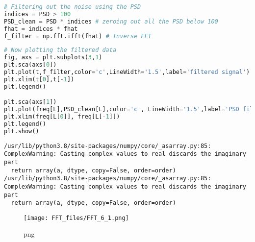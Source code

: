 \documentclass{article}
\begin{document}
\begin{lstlisting}[language=Python]
# Filtering out the noise using the PSD
indices = PSD > 100
PSD_clean = PSD * indices # zeroing out all the PSD below 100
fhat = indices * fhat
f_filter = np.fft.ifft(fhat) # Inverse FFT
\end{lstlisting}

\begin{lstlisting}[language=Python]
# Now plotting the filtered data
fig, axs = plt.subplots(3,1)
plt.sca(axs[0])
plt.plot(t,f_filter,color='c',LineWidth='1.5',label='filtered signal')
plt.xlim(t[0],t[-1])
plt.legend()

plt.sca(axs[1])
plt.plot(freq[L],PSD_clean[L],color='c', LineWidth='1.5',label='PSD filtered')
plt.xlim(freq[L[0]], freq[L[-1]])
plt.legend()
plt.show()
\end{lstlisting}

\begin{lstlisting}
/usr/lib/python3.8/site-packages/numpy/core/_asarray.py:85: ComplexWarning: Casting complex values to real discards the imaginary part
  return array(a, dtype, copy=False, order=order)
/usr/lib/python3.8/site-packages/numpy/core/_asarray.py:85: ComplexWarning: Casting complex values to real discards the imaginary part
  return array(a, dtype, copy=False, order=order)
\end{lstlisting}

\begin{figure}
\centering
\texttt{[image: FFT\_files/FFT\_6\_1.png]}
\caption{png}
\end{figure}

\begin{lstlisting}[language=Python]
\end{lstlisting}
\end{document}
